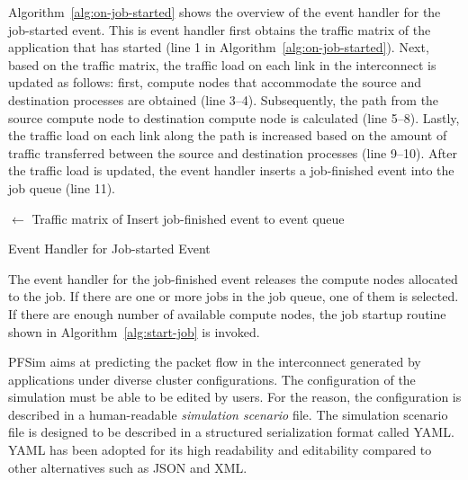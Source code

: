 Algorithm~\ref{alg:on-job-started} shows the overview of the event handler for
the job-started event. This is event handler first obtains the traffic matrix
of the application that has started (line 1 in
Algorithm~\ref{alg:on-job-started}). Next, based on the traffic matrix, the
traffic load on each link in the interconnect is updated as follows: first,
compute nodes that accommodate the source and destination processes are
obtained (line 3--4). Subsequently, the path from the source compute node to
destination compute node is calculated (line 5--8). Lastly, the traffic load
on each link along the path is increased based on the amount of traffic
transferred between the source and destination processes (line 9--10). After
the traffic load is updated, the event handler inserts a job-finished event
into the job queue (line 11).

\begin{algorithm}

    \TrafficMatrix $\gets$ Traffic matrix of \Job\;
    Insert job-finished event to event queue\;

    \caption{Event Handler for Job-started Event}%
    \label{alg:on-job-started}
\end{algorithm}

The event handler for the job-finished event releases the compute nodes
allocated to the job. If there are one or more jobs in the job queue, one of
them is selected. If there are enough number of available compute nodes, the
job startup routine shown in Algorithm~\ref{alg:start-job} is invoked.

PFSim aims at predicting the packet flow in the interconnect generated by
applications under diverse cluster configurations. The configuration of the
simulation must be able to be edited by users. For the reason, the
configuration is described in a human-readable \emph{simulation scenario}
file. The simulation scenario file is designed to be described in a structured
serialization format called YAML\@. YAML has been adopted for its high
readability and editability compared to other alternatives such as JSON and
XML\@.


